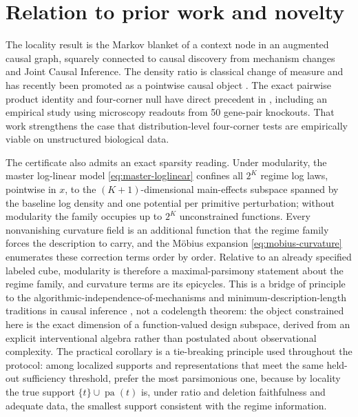 \documentclass[11pt]{article}
\newcommand{\pa}{\operatorname{pa}}
\begin{document}
\section{Relation to prior work and novelty}

The locality result is the Markov blanket of a context node in an augmented causal graph, squarely connected to causal discovery from mechanism changes and Joint Causal Inference.  The density ratio is classical change of measure and has recently been promoted as a pointwise causal object \citep{mahadevan2026density}.  The exact pairwise product identity and four-corner null have direct precedent in \citet{xu2024pairwise}, including an empirical study using microscopy readouts from 50 gene-pair knockouts.  That work strengthens the case that distribution-level four-corner tests are empirically viable on unstructured biological data.

The certificate also admits an exact sparsity reading.  Under modularity, the master log-linear model \eqref{eq:master-loglinear} confines all \(2^K\) regime log laws, pointwise in \(x\), to the \((K+1)\)-dimensional main-effects subspace spanned by the baseline log density and one potential per primitive perturbation; without modularity the family occupies up to \(2^K\) unconstrained functions.  Every nonvanishing curvature field is an additional function that the regime family forces the description to carry, and the M\"obius expansion \eqref{eq:mobius-curvature} enumerates these correction terms order by order.  Relative to an already specified labeled cube, modularity is therefore a maximal-parsimony statement about the regime family, and curvature terms are its epicycles.  This is a bridge of principle to the algorithmic-independence-of-mechanisms and minimum-description-length traditions in causal inference \citep{janzing2010algorithmic,grunwald2007mdl}, not a codelength theorem: the object constrained here is the exact dimension of a function-valued design subspace, derived from an explicit interventional algebra rather than postulated about observational complexity.  The practical corollary is a tie-breaking principle used throughout the protocol: among localized supports and representations that meet the same held-out sufficiency threshold, prefer the most parsimonious one, because by locality the true support \(\{t\}\cup\pa(t)\) is, under ratio and deletion faithfulness and adequate data, the smallest support consistent with the regime information.
\end{document}
